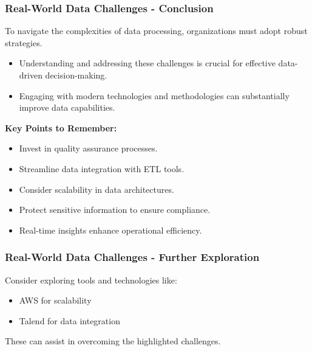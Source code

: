 \documentclass{beamer}
\begin{document}
\begin{frame}[fragile]
    \frametitle{Real-World Data Challenges - Conclusion}
    To navigate the complexities of data processing, organizations must adopt robust strategies. 
    \begin{itemize}
        \item Understanding and addressing these challenges is crucial for effective data-driven decision-making.
        \item Engaging with modern technologies and methodologies can substantially improve data capabilities.
    \end{itemize}
    
    \textbf{Key Points to Remember:}
    \begin{itemize}
        \item Invest in quality assurance processes.
        \item Streamline data integration with ETL tools.
        \item Consider scalability in data architectures.
        \item Protect sensitive information to ensure compliance.
        \item Real-time insights enhance operational efficiency.
    \end{itemize}
\end{frame}

\begin{frame}[fragile]
    \frametitle{Real-World Data Challenges - Further Exploration}
    Consider exploring tools and technologies like:
    \begin{itemize}
        \item AWS for scalability
        \item Talend for data integration
    \end{itemize}
    These can assist in overcoming the highlighted challenges.
\end{frame}
\end{document}

